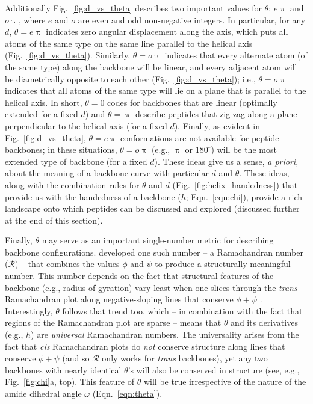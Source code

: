 \documentclass[fleqn,10pt,lineno]{wlpeerj} %
\newcommand{\Fig}[1]{Fig.~\ref{#1}}
\newcommand{\Eqn}[1]{Eqn.~\ref{#1}}
\newcommand{\h}{h}
\newcommand{\cis}{{\em cis}\xspace}
\newcommand{\trans}{{\em trans}\xspace}
\begin{document}
{Additionally \Fig{fig:d_vs_theta} describes two important values for $\theta$: $e\uppi$ and $o\uppi$, where $e$ and $o$ are even and odd non-negative integers. In particular, for any $d$, $\theta=e\uppi$ indicates zero angular displacement along the axis, which puts all atoms of the same type on the same line parallel to the helical axis (\Fig{fig:d_vs_theta}). Similarly, $\theta=o\uppi$ indicates that every alternate atom (of the same type) along the backbone will be linear, and every adjacent atom will be diametrically opposite to each other (\Fig{fig:d_vs_theta}); i.e., $\theta=o\uppi$ indicates that all atoms of the same type will lie on a plane that is parallel to the helical axis. In short, $\theta=0$ codes for backbones that are linear (optimally extended for a fixed $d$) and $\theta=\uppi$ describe peptides that zig-zag along a plane perpendicular to the helical axis (for a fixed $d$). Finally, as evident in \Fig{fig:d_vs_theta}, $\theta=e\uppi$ conformations are not available for peptide backbones; in these situations, $\theta=o\uppi$ (e.g., $\uppi$ or $180^\circ$) will be the most extended type of backbone (for a fixed $d$). These ideas give us a sense, {\it a priori}, about the meaning of a backbone curve with particular $d$ and $\theta$. These ideas, along with the combination rules for $\theta$ and $d$ (\Fig{fig:helix_handedness}) that provide us with the handedness of a backbone ($\h$; \Eqn{eqn:chi}), provide a rich landscape onto which peptides can be discussed and explored (discussed further at the end of this section).

Finally, $\theta$ may serve as an important single-number metric for describing backbone configurations. \cite{Mannige2016} developed one such number -- a Ramachandran number ($\mathcal{R}$) -- that combines the values $\phi$ and $\psi$ to produce a structurally meaningful number. This number depends on the fact that structural features of the backbone (e.g., radius of gyration) vary least when one slices through the \trans Ramachandran plot along negative-sloping lines that conserve $\phi+\psi$ \citep{Ho2003,Zacharias2013,Mannige2016}. Interestingly, $\theta$ follows that trend too, which -- in combination with the fact that regions of the Ramachandran plot are sparse \citep{Mannige2016} -- means that $\theta$ and its derivatives (e.g., $\h$) are {\it universal} Ramachandran numbers. The universality arises from the fact that \cis Ramachandran plots do {\it not} conserve structure along lines that conserve $\phi+\psi$ (and so $\mathcal{R}$ only works for \trans backbones), yet any two backbones with nearly identical $\theta$'s will also be conserved in structure (see, e.g., \Fig{fig:chi}a, top). This feature of $\theta$ will be true irrespective of the nature of the amide dihedral angle $\omega$ (\Eqn{eqn:theta}).
}
\end{document}
